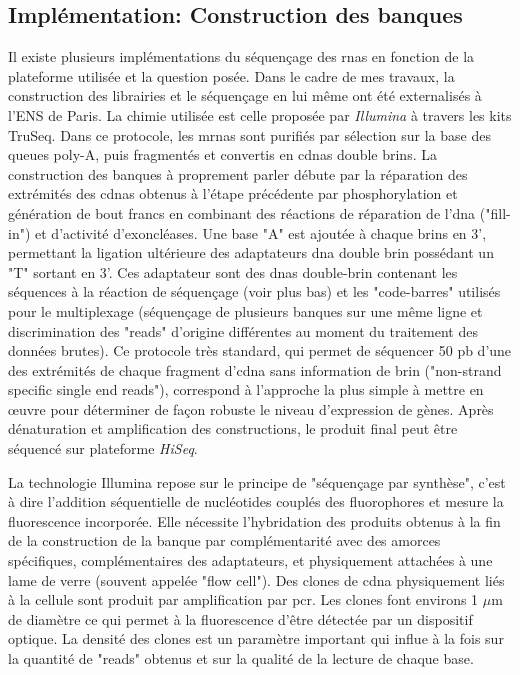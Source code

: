 \documentclass[../main.tex]{subfiles}
\begin{document}
\subsection{Implémentation: Construction des banques}
Il existe plusieurs implémentations du séquençage des \glspl{rna} en fonction de la plateforme utilisée et la question posée.
Dans le cadre de mes travaux, la construction des librairies et le séquençage en lui même ont été externalisés à l'ENS de Paris.
La chimie utilisée est celle proposée par \textit{Illumina} à travers les kits TruSeq.
Dans ce protocole, les \glspl{mrna} sont purifiés par sélection sur la base des queues poly-A, puis fragmentés et convertis en \glspl{cdna} double brins.
La construction des banques à proprement parler débute par la réparation des extrémités des \glspl{cdna} obtenus à l'étape précédente par phosphorylation et génération de bout francs en combinant des réactions de réparation de l'\gls{dna} ("fill-in") et d'activité d'exoncléases.
Une base "A" est ajoutée à chaque brins en 3', permettant la ligation ultérieure des adaptateurs \gls{dna} double brin possédant un "T" sortant en 3'.
Ces adaptateur sont des \glspl{dna} double-brin contenant les séquences à la réaction de séquençage (voir plus bas) et les "code-barres" utilisés pour le multiplexage (séquençage de plusieurs banques sur une même ligne et discrimination des "reads" d'origine différentes au moment du traitement des données brutes).
Ce protocole très standard, qui permet de séquencer 50 \gls{pb} d'une des extrémités de chaque fragment d'\gls{cdna} sans information de brin ("non-strand specific single end reads"), correspond à l'approche la plus simple à mettre en œuvre pour déterminer de façon robuste le niveau d'expression de gènes.
Après dénaturation et amplification des constructions, le produit final peut être séquencé sur plateforme \textit{HiSeq}.
\par
La technologie Illumina repose sur le principe de "séquençage par synthèse", c'est à dire l'addition séquentielle de nucléotides couplés des fluorophores et mesure la fluorescence incorporée.
Elle nécessite l'hybridation des produits obtenus à la fin de la construction de la banque par complémentarité avec des amorces spécifiques, complémentaires des adaptateurs, et physiquement attachées à une lame de verre (souvent appelée "flow cell").
Des clones de \gls{cdna} physiquement liés à la cellule sont produit par amplification par \gls{pcr}.
Les clones font environs 1 $\mu$m de diamètre ce qui permet à la fluorescence d'être détectée par un dispositif optique.
La densité des clones est un paramètre important qui influe à la fois sur la quantité de "reads" obtenus et sur la qualité de la lecture de chaque base.
\end{document}
